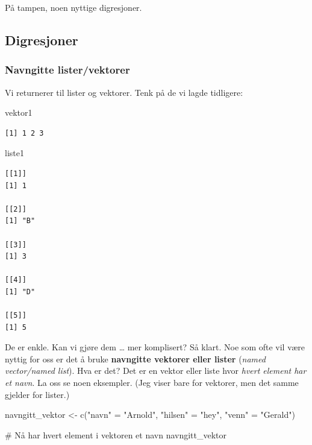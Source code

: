 \documentclass[
  letterpaper,
  DIV=11,
  numbers=noendperiod]{scrartcl}
\newenvironment{Shaded}{\begin{snugshade}}{\end{snugshade}}
\newcommand{\CommentTok}[1]{\textcolor[rgb]{0.37,0.37,0.37}{#1}}
\newcommand{\FunctionTok}[1]{\textcolor[rgb]{0.28,0.35,0.67}{#1}}
\newcommand{\NormalTok}[1]{\textcolor[rgb]{0.00,0.23,0.31}{#1}}
\newcommand{\OtherTok}[1]{\textcolor[rgb]{0.00,0.23,0.31}{#1}}
\newcommand{\StringTok}[1]{\textcolor[rgb]{0.13,0.47,0.30}{#1}}
\begin{document}
På tampen, noen nyttige digresjoner.

\hypertarget{digresjoner}{%
\subsection{Digresjoner}\label{digresjoner}}

\hypertarget{sec-navngitt-vektor}{%
\subsubsection{Navngitte lister/vektorer}\label{sec-navngitt-vektor}}

Vi returnerer til lister og vektorer. Tenk på de vi lagde tidligere:

\begin{Shaded}
\begin{Highlighting}[]
\NormalTok{vektor1}
\end{Highlighting}
\end{Shaded}

\begin{verbatim}
[1] 1 2 3
\end{verbatim}

\begin{Shaded}
\begin{Highlighting}[]
\NormalTok{liste1}
\end{Highlighting}
\end{Shaded}

\begin{verbatim}
[[1]]
[1] 1

[[2]]
[1] "B"

[[3]]
[1] 3

[[4]]
[1] "D"

[[5]]
[1] 5
\end{verbatim}

De er enkle. Kan vi gjøre dem \ldots{} mer komplisert? Så klart. Noe som
ofte vil være nyttig for oss er det å bruke \textbf{navngitte vektorer
eller lister} (\emph{named vector/named list}). Hva er det? Det er en
vektor eller liste hvor \emph{hvert element har et navn}. La oss se noen
eksempler. (Jeg viser bare for vektorer, men det samme gjelder for
lister.)

\begin{Shaded}
\begin{Highlighting}[]
\NormalTok{navngitt\_vektor }\OtherTok{\textless{}{-}} \FunctionTok{c}\NormalTok{(}\StringTok{"navn"} \OtherTok{=} \StringTok{"Arnold"}\NormalTok{,}
                     \StringTok{"hilsen"} \OtherTok{=} \StringTok{"hey"}\NormalTok{,}
                     \StringTok{"venn"} \OtherTok{=} \StringTok{"Gerald"}\NormalTok{)}

\CommentTok{\# Nå har hvert element i vektoren et navn}
\NormalTok{navngitt\_vektor}
\end{Highlighting}
\end{Shaded}
\end{document}
